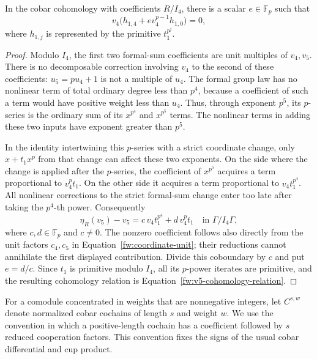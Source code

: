 \begin{lemma}
\label{fw:v5-relation}
In the cobar cohomology with coefficients $R/I_4$, there is a scalar
$e\in\mathbb F_p$ such that
\begin{equation}
 v_4\bigl(h_{1,4}+e v_4^{p-1}h_{1,0}\bigr)=0,
 \label{fw:v5-cohomology-relation}
\end{equation}
where $h_{1,j}$ is represented by the primitive $t_1^{p^j}$.
\end{lemma}

\begin{proof}
Modulo $I_4$, the first two formal-sum coefficients are unit multiples of
$v_4,v_5$.  There is no decomposable correction involving $v_4$ to the
second of these coefficients: $u_5=pu_4+1$ is not a multiple of $u_4$.
The formal group law has no nonlinear term of total ordinary degree less
than $p^4$, because a coefficient of such a term would have positive weight
less than $u_4$.  Thus, through exponent $p^5$, its $p$-series is the ordinary
sum of its $x^{p^4}$ and $x^{p^5}$ terms.  The nonlinear terms in adding
these two inputs have exponent greater than $p^5$.

In the identity intertwining this $p$-series with a strict coordinate
change, only $x+t_1x^p$ from that change can affect these two exponents.
On the side where the change is applied after the $p$-series, the
coefficient of $x^{p^5}$ acquires a term proportional to $v_4^p t_1$.
On the other side it acquires a term proportional to
$v_4t_1^{p^4}$.  All nonlinear corrections to the strict formal-sum change
enter too late after taking the $p^4$-th power.  Consequently
\[
 \eta_R(v_5)-v_5=c\,v_4t_1^{p^4}+d\,v_4^p t_1
 \quad\text{in }\Gamma/I_4\Gamma,
\]
where $c,d\in\mathbb F_p$ and $c\ne0$.  The nonzero coefficient follows
also directly from the unit factors $c_4,c_5$ in
Equation~\eqref{fw:coordinate-unit}; their reductions cannot annihilate
the first displayed contribution.  Divide this coboundary by $c$ and put
$e=d/c$.  Since $t_1$ is primitive modulo $I_4$, all its $p$-power iterates
are primitive, and the resulting cohomology relation is
Equation~\eqref{fw:v5-cohomology-relation}.
\end{proof}

For a comodule concentrated in weights that are nonnegative integers, let
$C^{s,w}$ denote normalized cobar cochains of length $s$ and weight $w$.
We use the convention in which a positive-length cochain has a coefficient
followed by $s$ reduced cooperation factors.  This convention fixes the
signs of the usual cobar differential and cup product.

